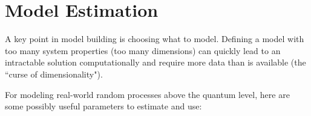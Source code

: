 \chapter{Model Estimation}
\label{chp:model_estimation}
A key point in model building is choosing what to model.
Defining a model with too many system properties (too many dimensions) can quickly lead to 
an intractable solution computationally and require more data than is available
(the ``curse of dimensionality").

For modeling real-world random processes above the quantum level, here are some possibly useful parameters to estimate and use:
